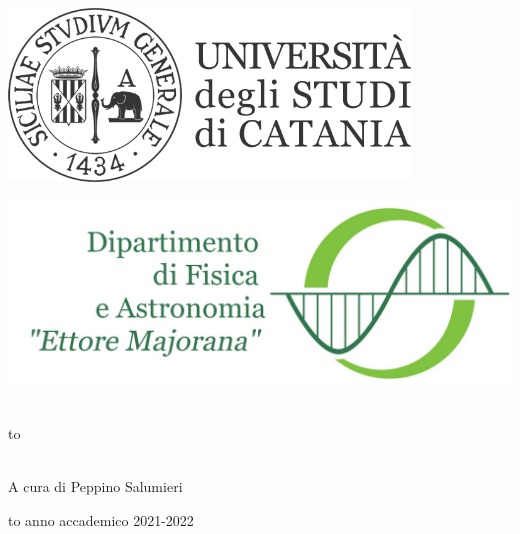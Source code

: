 \documentclass[openany,12pt]{book}
\newcommand\blankpage{%
    \null
    \thispagestyle{empty}%
    \newpage} %
\begin{document}
\thispagestyle{empty}
\begin{center}

\begin{minipage}[c]{0.45\textwidth}
\begin{flushleft}
\includegraphics[width=0.8\textwidth]{logo-unict-orizzontale-grigio.png}
\end{flushleft}
\end{minipage}
\hfill
\begin{minipage}[c]{0.45\textwidth}
\begin{flushright}
\includegraphics[width=\textwidth]{logo_dfa_orizzontale}
\end{flushright}
\end{minipage}\\
\medskip
\hbox to \textwidth{\hrulefill}

\vfill
\vfill


\uppercase{}\\

\vfill
\large{A cura di Peppino Salumieri}

\vfill
\vfill
\hbox to \textwidth{\hrulefill}
{\sc anno accademico 2021-2022}
\end{center}

\afterpage{\blankpage}
\newpage

\tableofcontents

\newpage

\pagestyle{fancy}
\fancyhf{}
\fancyhead[LE]{\nouppercase{\textbf{\thepage}\hfill\rightmark}}
\fancyhead[RO]{\nouppercase{\leftmark\hfill\textbf{\thepage}}}
\end{document}
